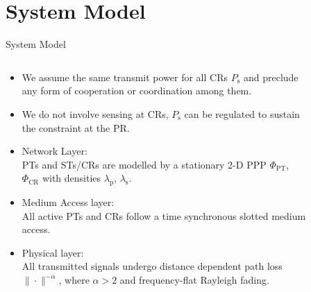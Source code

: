 \documentclass[12pt]{beamer}
\newcommand{\fs}[1]{\fontsize{ #1 pt}{8.2}\selectfont}
\newcommand{\sub}[1]{_{\text{#1}}}
\begin{document}
\section{System Model}
\begin{frame}{System Model}
        \begin{columns}
        \begin{column}{0.49\paperwidth}
		\fs{8}
		\begin{itemize}	
			\item<1-> We assume the same transmit power for all CRs $P\sub{s}$ and preclude any form of cooperation or coordination among them.
			\item<1-> We do not involve sensing at CRs, $P\sub{s}$ can be regulated to sustain the constraint at the PR. 
			\item<2-> Network Layer: \\ {
				PTs and STs/CRs are modelled by a stationary 2-D PPP $\Phi\sub{PT}$, $\Phi\sub{CR}$ with densities $\lambda\sub{p}$, $\lambda\sub{s}$.}
			\item<3-> Medium Access layer: \\{
All active PTs and CRs follow a time synchronous slotted medium access.}
			\item<4-> Physical layer: \\
{
All transmitted signals undergo distance dependent path loss $\| \cdot \|^{-\alpha}$, where $\alpha>2$ and frequency-flat Rayleigh fading.}
	\end{itemize}
	\end{column}
        \begin{column}{0.49\paperwidth}
		\fs{8}
       	  	\begin{figure}
			\centering

\end{figure}
\end{column}
\end{columns}
\end{frame}
\end{document}

